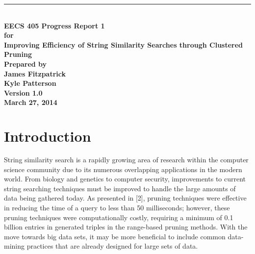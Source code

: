 \documentclass[pdftex,12pt,letter]{article}
\newcommand{\HRule}{\rule{\linewidth}{0.5mm}}
\begin{document}
\begin{titlepage}
\begin{flushright}
\HRule \\[0.4cm]
{ \bfseries
{\huge EECS 405 Progress Report 1\\[1cm]}
{\Large for\\[1cm]}
{\large Improving Efficiency of String Similarity Searches through Clustered Pruning\\[3cm]}
{\large Prepared by\\[1cm]James Fitzpatrick\\Kyle Patterson\\[2cm]
Version 1.0\\
March 27, 2014\\
}}
\end{flushright}
\end{titlepage}

\tableofcontents
\newpage

\section{Introduction}
String similarity search is a rapidly growing area of research within the computer science community due to its numerous overlapping applications in the modern world. From biology and genetics to computer security, improvements to current string searching techniques must be improved to handle the large amounts of data being gathered today.  As presented in [2], pruning techniques were effective in reducing the time of a query to less than 50 milliseconds; however, these pruning techniques were computationally costly, requiring a minimum of 0.1 billion entries in generated triples in the range-based pruning methods. With the move towards big data sets, it may be more beneficial to include common data-mining practices that are already designed for large sets of data.
\end{document}
